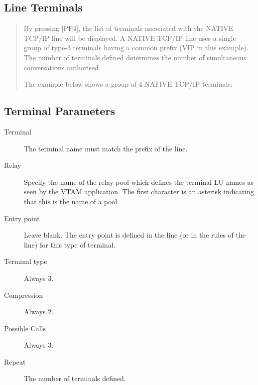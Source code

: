 \documentclass[letterpaper,10pt,english]{sphinxmanual}
\begin{document}
\subsection{Line Terminals}
\label{\detokenize{connectivity_guide:line-terminals}}\label{\detokenize{connectivity_guide:index-36}}\begin{quote}

By pressing {[}PF4{]}, the list of terminals associated with the NATIVE TCP/IP line will be displayed. A NATIVE TCP/IP line uses a single group of type-3 terminals having a common prefix (VIP in this example). The number of terminals defined determines the number of simultaneous conversations authorised.

The example below shows a group of 4 NATIVE TCP/IP terminals:
\end{quote}



\subsection{Terminal Parameters}
\label{\detokenize{connectivity_guide:id13}}\label{\detokenize{connectivity_guide:index-37}}\begin{description}
\item[{Terminal}] \leavevmode
The terminal name must match the prefix of the line.

\item[{Relay}] \leavevmode
Specify the name of the relay pool which defines the terminal LU
names as seen by the VTAM application. The first character is an
asterisk indicating that this is the name of a pool.

\item[{Entry point}] \leavevmode
Leave blank. The entry point is defined in the line (or in the rules
of the line) for this type of terminal.

\item[{Terminal type}] \leavevmode
Always 3.

\item[{Compression}] \leavevmode
Always 2.

\item[{Possible Calls}] \leavevmode
Always 3.

\item[{Repeat}] \leavevmode
The number of terminals defined.

\end{description}
\end{document}
